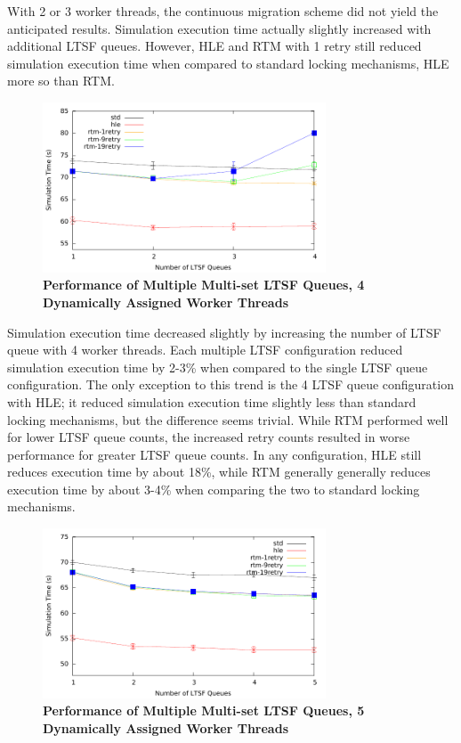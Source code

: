 \documentclass[11pt]{book}
\begin{document}
With 2 or 3 worker threads, the continuous migration scheme did not yield the
anticipated results.  Simulation execution time actually slightly increased with
additional LTSF queues.  However, HLE and RTM with 1 retry still reduced
simulation execution time when compared to standard locking mechanisms, HLE more so
than RTM.

\begin{figure}
    \centering
    \graphicspath{ {./figures/} }
    \includegraphics[width=0.75\textwidth,keepaspectratio]{hugeepidemicsim-CONTmig-timeVSschedQs-multiset-4thread}
    \caption{\textbf{Performance of Multiple Multi-set LTSF Queues, 4 Dynamically Assigned Worker Threads}}
    \label{fig:contThrMig_timeVSschq_4threads}
\end{figure}

Simulation execution time decreased slightly by increasing the number of LTSF
queue with 4 worker threads.  Each multiple LTSF configuration reduced
simulation execution time by 2-3\% when compared to the single LTSF queue
configuration.  The only exception to this trend is the 4 LTSF queue
configuration with HLE; it reduced simulation execution time slightly less than
standard locking mechanisms, but the difference seems trivial.  While RTM
performed well for lower LTSF queue counts, the increased retry counts resulted
in worse performance for greater LTSF queue counts.  In any configuration, HLE
still reduces execution time by about 18\%, while RTM generally generally
reduces execution time by about 3-4\% when comparing the two to standard locking
mechanisms.

\begin{figure}
    \centering
    \graphicspath{ {./figures/} }
    \includegraphics[width=0.75\textwidth,keepaspectratio]{hugeepidemicsim-CONTmig-timeVSschedQs-multiset-5thread}
    \caption{\textbf{Performance of Multiple Multi-set LTSF Queues, 5 Dynamically Assigned Worker Threads}}
    \label{fig:contThrMig_timeVSschq_5threads}
\end{figure}
\end{document}
